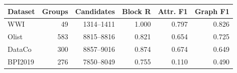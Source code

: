 \begin{tabular}{lrrrrr}
\toprule
Dataset & Groups & Candidates & Block R & Attr. F1 & Graph F1 \\
\midrule
WWI & 49 & 1314--1411 & 1.000 & 0.797 & 0.826 \\
Olist & 583 & 8815--8816 & 0.821 & 0.654 & 0.725 \\
DataCo & 300 & 8857--9016 & 0.874 & 0.674 & 0.649 \\
BPI2019 & 276 & 7850--8049 & 0.755 & 0.110 & 0.490 \\
\bottomrule
\end{tabular}
